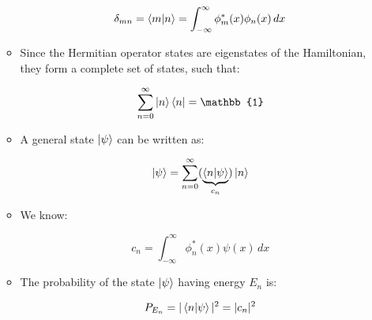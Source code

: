 \begin{itemize}
\begin{itemize}
        $$\delta_{mn}=\bra{m}\ket{n}=\int_{-\infty}^{\infty} \phi_m^*(x)\phi_n(x)\,dx$$

      \item Since the Hermitian operator states are eigenstates of the Hamiltonian, they form a complete set of states, such that:

        $$\sum_{n=0}^{\infty} \ket{n}\bra{n}=\mathbb{1}$$

      \item A general state $\ket{\psi}$ can be written as:

        $$\ket{\psi}=\sum_{n=0}^{\infty} (\underbrace{\bra{n}\ket{\psi}}_{c_n})\ket{n}$$

      \item We know:

        $$c_n=\int_{-\infty}^{\infty}\phi_n^*(x)\psi(x)\,dx$$

      \item The probability of the state $\ket{\psi}$ having energy $E_n$ is:

        $$P_{E_n}=|\bra{n}\ket{\psi}|^2=|c_n|^2$$

    \end{itemize}

\end{itemize}



